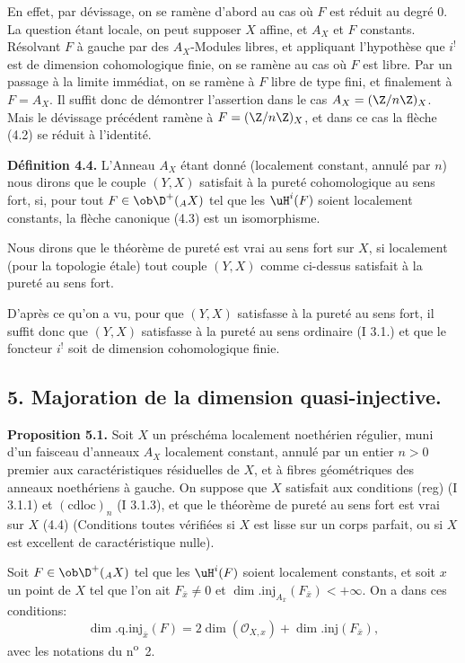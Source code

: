 En effet, par dévissage, on se ramène d'abord au cas où $F$ est réduit au degré $0$. La question étant locale, on peut supposer $X$ affine, et $A_X$ et $F$ constants. Résolvant $F$ à gauche par des $A_X$-Modules libres, et appliquant l'hypothèse que $i^!$ est de dimension cohomologique finie, on se ramène au cas où $F$ est libre. Par un passage à la limite immédiat, on se ramène à $F$ libre de type fini, et finalement à $F=A_X$. Il suffit donc de démontrer l'assertion dans le cas $A_X=(\Z/n\Z)_X$. Mais le dévissage précédent ramène à $F=(\Z/n\Z)_X$, et dans ce cas la flèche (4.2) se réduit à l'identité.

\textbf{Définition 4.4.} L'Anneau $A_X$ étant donné (localement constant, annulé par $n$) nous dirons que le couple $(Y,X)$ satisfait à la pureté cohomologique au sens fort, si, pour tout $F\in\ob\D^+({}_A X)$ tel que les $\uH^i(F)$ soient localement constants, la flèche canonique (4.3) est un isomorphisme.

Nous dirons que le théorème de pureté est vrai au sens fort sur $X$, si localement (pour la topologie étale) tout couple $(Y,X)$ comme ci-dessus satisfait à la pureté au sens fort.

D'après ce qu'on a vu, pour que $(Y,X)$ satisfasse à la pureté au sens fort, il suffit donc que $(Y,X)$ satisfasse à la pureté au sens ordinaire (I 3.1.) et que le foncteur $i^!$ soit de dimension cohomologique finie.

\subsection*{5. Majoration de la dimension quasi-injective.}

\textbf{Proposition 5.1.} Soit $X$ un préschéma localement noethérien régulier, muni d'un faisceau d'anneaux $A_X$ localement constant, annulé par un entier $n>0$ premier aux caractéristiques résiduelles de $X$, et à fibres géométriques des anneaux noethériens à gauche. On suppose que $X$ satisfait aux conditions (reg) (I 3.1.1) et $(\mathrm{cdloc})_n$ (I 3.1.3), et que le théorème de pureté au sens fort est vrai sur $X$ (4.4) (Conditions toutes vérifiées si $X$ est lisse sur un corps parfait, ou si $X$ est excellent de caractéristique nulle).

Soit $F\in\ob\D^+({}_A X)$ tel que les $\uH^i(F)$ soient localement constants, et soit $x$ un point de $X$ tel que l'on ait $F_{\bar{x}}\neq0$ et $\dim.\mathrm{inj}_{A_{\bar{x}}}(F_{\bar{x}})<+\infty$. On a dans ces conditions:
\[
        \dim.\mathrm{q.inj}_{\bar{x}}(F)=2\dim(\mathcal{O}_{X,x})+\dim.\mathrm{inj}(F_{\bar{x}}),
\]
avec les notations du n\textsuperscript{o}~2.

